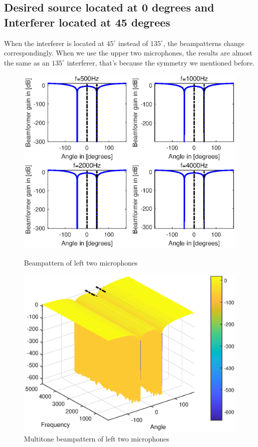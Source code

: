 \documentclass[onecolumn, conference]{IEEEtran}
\begin{document}
\subsection{Desired source located at 0 degrees and Interferer located at 45 degrees}

When the interferer is located at \(45^{\circ}\) instead of \(135^{\circ}\), the beampatterns change correspondingly. When we use the upper two microphones, the results are almost the same as an \(135^{\circ}\) interferer, that's because the symmetry we mentioned before.



\begin{figure}[htbp]
	\begin{minipage}[b]{0.5\linewidth}
		\centerline{\includegraphics[width=1\textwidth]{img/1_b_1.eps}}
		\caption{Beampattern of left two microphones}
		\label{Beampattern of left two microphones45}
	\end{minipage}
	\hfill
	\begin{minipage}[b]{0.5\linewidth}
		\centerline{\includegraphics[width=1\textwidth]{img/1_a_1_multi_45.eps}}
		\caption{Multitone beampattern of left two microphones}
		\label{Multitone beampattern of left two microphones45}
	\end{minipage}
\end{figure}
\end{document}
